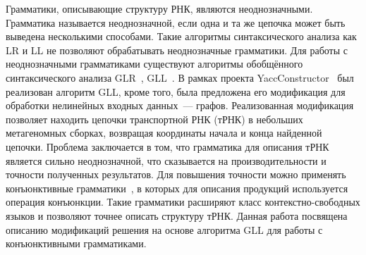 Грамматики, описывающие структуру РНК, являются неоднозначными. Грамматика называется неоднозначной, если одна и та же цепочка может быть выведена несколькими способами. Такие алгоритмы синтаксического анализа как LR и LL не позволяют обрабатывать неоднозначные грамматики. Для работы с неоднозначными грамматиками существуют алгоритмы обобщённого синтаксического анализа GLR~\cite{GLR}, GLL~\cite{GLL}. В рамках проекта YaccConstructor~\cite{YaccConstructorPage, YaccConstructorPaper} был реализован алгоритм GLL, кроме того, была предложена его модификация для обработки нелинейных входных данных~--- графов. Реализованная модификация позволяет находить цепочки транспортной РНК (тРНК) в небольших метагеномных сборках, возвращая координаты начала и конца найденной цепочки. Проблема заключается в том, что грамматика для описания тРНК является сильно неоднозначной, что сказывается на производительности и точности полученных результатов. Для повышения точности можно применять конъюнктивные грамматики~\cite{ConjGrammars}, в которых для описания продукций используется операция конъюнкции. Такие грамматики расширяют класс контекстно-свободных языков и позволяют точнее описать структуру тРНК. Данная работа посвящена описанию модификаций решения на основе алгоритма GLL для работы с конъюнктивными грамматиками.
